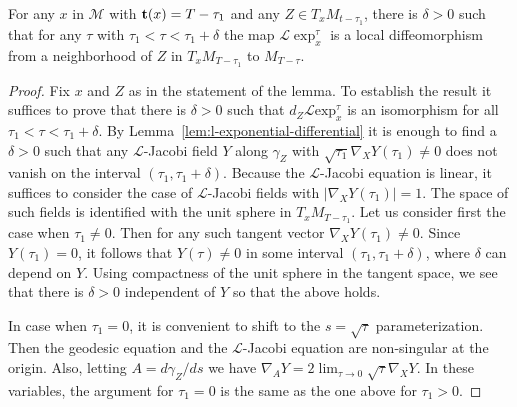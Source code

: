 \begin{lemma}\label{lem:l-exponential-local-diffeomorphism}
\label{locstr}

For any $x$ in ${\mathcal M}$ with ${\bf
t}(x)=T-\tau_1$ and any $Z\in T_xM_{t-\tau_1}$, there is $\delta>0$
such that for any $\tau$ with $\tau_1<\tau<\tau_1+\delta$ the map
${\mathcal L}\exp_x^{\tau}$ is a local diffeomorphism from a
neighborhood of $Z$ in $T_xM_{T-\tau_1}$ to $M_{T-\tau}$.
\end{lemma}

\begin{proof}
\sketch
{}
Fix $x$ and $Z$ as in the statement of the lemma. To establish the result it
suffices to prove that there is $\delta>0$ such that $d_Z{\mathcal L}\mathrm{exp}_x^{\tau}$ is an isomorphism for all $\tau_1<\tau<\tau_1+\delta$. By
Lemma~\ref{lem:l-exponential-differential} it is enough to find a $\delta>0$ such that any ${\mathcal
L}$-Jacobi field $Y$ along
 $\gamma_Z$ with $\sqrt{\tau_1}\nabla_XY(\tau_1)\not= 0$ does
 not vanish on the interval $(\tau_1,\tau_1+\delta)$.
 Because the ${\mathcal L}$-Jacobi equation is linear, it suffices to consider the
 case of ${\mathcal L}$-Jacobi fields with
 $|\nabla_XY(\tau_1)|=1$. The space of such fields is identified with the
 unit sphere in $T_xM_{T-\tau_1}$.
 Let us consider first the case when $\tau_1\not= 0$. Then for any
 such tangent vector $\nabla_XY(\tau_1)\not=0$. Since $Y(\tau_1)=0$,
 it follows that $Y(\tau)\not=0$ in some interval
 $(\tau_1,\tau_1+\delta)$, where $\delta$ can depend on $Y$.  Using
 compactness of the unit sphere in the tangent space, we see that there is $\delta>0$
 independent of $Y$ so that the above holds.

 In case when $\tau_1=0$, it is convenient to shift to the
 $s=\sqrt{\tau}$ parameterization. Then the geodesic equation and
 the ${\mathcal L}$-Jacobi equation are non-singular at the origin. Also, letting
 $A=d\gamma_Z/ds$ we have $\nabla_AY=2\lim_{\tau\rightarrow
 0}\sqrt{\tau}\nabla_XY$. In these variables, the argument for $\tau_1=0$
 is the same as the one above for $\tau_1>0$.
\end{proof}


